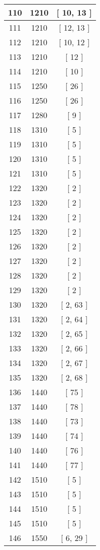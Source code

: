 \begin{center}
\begin{longtable}[H]{|| c c c ||}
\hline
110 & 1210 & [ 10, 13 ] \\ 
\hline
111 & 1210 & [ 12, 13 ] \\ 
\hline
112 & 1210 & [ 10, 12 ] \\ 
\hline
113 & 1210 & [ 12 ] \\ 
\hline
114 & 1210 & [ 10 ] \\ 
\hline
115 & 1250 & [ 26 ] \\ 
\hline
116 & 1250 & [ 26 ] \\ 
\hline
117 & 1280 & [ 9 ] \\ 
\hline
118 & 1310 & [ 5 ] \\ 
\hline
119 & 1310 & [ 5 ] \\ 
\hline
120 & 1310 & [ 5 ] \\ 
\hline
121 & 1310 & [ 5 ] \\ 
\hline
122 & 1320 & [ 2 ] \\ 
\hline
123 & 1320 & [ 2 ] \\ 
\hline
124 & 1320 & [ 2 ] \\ 
\hline
125 & 1320 & [ 2 ] \\ 
\hline
126 & 1320 & [ 2 ] \\ 
\hline
127 & 1320 & [ 2 ] \\ 
\hline
128 & 1320 & [ 2 ] \\ 
\hline
129 & 1320 & [ 2 ] \\ 
\hline
130 & 1320 & [ 2, 63 ] \\ 
\hline
131 & 1320 & [ 2, 64 ] \\ 
\hline
132 & 1320 & [ 2, 65 ] \\ 
\hline
133 & 1320 & [ 2, 66 ] \\ 
\hline
134 & 1320 & [ 2, 67 ] \\ 
\hline
135 & 1320 & [ 2, 68 ] \\ 
\hline
136 & 1440 & [ 75 ] \\ 
\hline
137 & 1440 & [ 78 ] \\ 
\hline
138 & 1440 & [ 73 ] \\ 
\hline
139 & 1440 & [ 74 ] \\ 
\hline
140 & 1440 & [ 76 ] \\ 
\hline
141 & 1440 & [ 77 ] \\ 
\hline
142 & 1510 & [ 5 ] \\ 
\hline
143 & 1510 & [ 5 ] \\ 
\hline
144 & 1510 & [ 5 ] \\ 
\hline
145 & 1510 & [ 5 ] \\ 
\hline
146 & 1550 & [ 6, 29 ] \\ 

\end{longtable}
\end{center}
